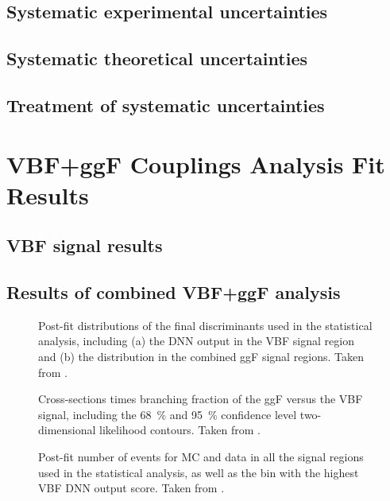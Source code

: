 \subsection{Systematic experimental uncertainties}
\subsection{Systematic theoretical uncertainties}
\subsection{Treatment of systematic uncertainties}

\section{\HWW VBF+ggF Couplings Analysis Fit Results}
\subsection{VBF signal results}

\subsection{Results of combined VBF+ggF analysis}

\begin{figure}
    \caption{Post-fit distributions of the final discriminants used in the statistical analysis, including (a) the DNN output in the VBF signal region and (b) the \mT distribution in the combined ggF signal regions. Taken from .}
    \label{fig:post-fit-final-discriminatns}
\end{figure}

\begin{figure}
    \caption{Cross-sections times branching fraction of the ggF versus the VBF signal, including the \SI{68}{\percent} and \SI{95}{\percent} confidence level two-dimensional likelihood contours. Taken from .}
    \label{fig:avocado-plot}
\end{figure}

\begin{figure}
    \caption{Post-fit number of events for MC and data in all the signal regions used in the statistical analysis, as well as the bin with the highest VBF DNN output score. Taken from .}
    \label{fig:post-fit-yields}
\end{figure}

